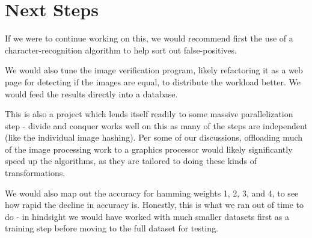 \documentclass[11pt,a4paper,titlepage]{article}
\begin{document}
\section{Next Steps}

If we were to continue working on this, we would recommend first the use of a
character-recognition algorithm to help sort out false-positives.

We would also tune the image verification program, likely refactoring it as a
web page for detecting if the images are equal, to distribute the workload
better.  We would feed the results directly into a database.

This is also a project which lends itself readily to some massive
parallelization step - divide and conquer works well on this as many of the
steps are independent (like the individual image hashing).  Per some of our
discussions, offloading much of the image processing work to a graphics
processor would likely significantly speed up the algorithms, as they are
tailored to doing these kinds of transformations.

We would also map out the accuracy for hamming weights 1, 2, 3, and 4, to see
how rapid the decline in accuracy is.  Honestly, this is what we ran out of time
to do - in hindsight we would have worked with much smaller datasets first as a
training step before moving to the full dataset for testing.
\end{document}
